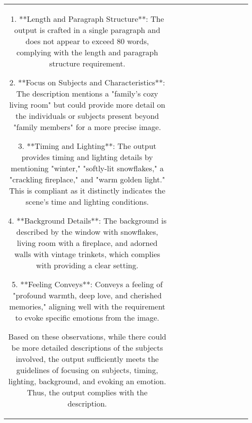 \begin{table}[h!]
\begin{tabular}{|c|c|c|c|c|c|c|c|c|c|c|}
1. **Length and Paragraph Structure**: The output is crafted in a single paragraph and does not appear to exceed 80 words, complying with the length and paragraph structure requirement.

2. **Focus on Subjects and Characteristics**: The description mentions a "family's cozy living room" but could provide more detail on the individuals or subjects present beyond "family members" for a more precise image.

3. **Timing and Lighting**: The output provides timing and lighting details by mentioning "winter," "softly-lit snowflakes," a "crackling fireplace," and "warm golden light." This is compliant as it distinctly indicates the scene's time and lighting conditions.

4. **Background Details**: The background is described by the window with snowflakes, living room with a fireplace, and adorned walls with vintage trinkets, which complies with providing a clear setting.

5. **Feeling Conveys**: Conveys a feeling of "profound warmth, deep love, and cherished memories," aligning well with the requirement to evoke specific emotions from the image.

Based on these observations, while there could be more detailed descriptions of the subjects involved, the output sufficiently meets the guidelines of focusing on subjects, timing, lighting, background, and evoking an emotion. Thus, the output complies with the description.


\end{tabular}
\end{table}
